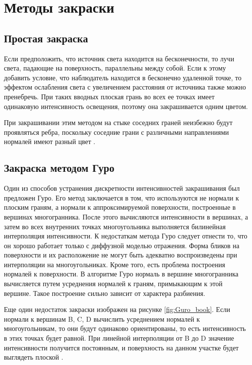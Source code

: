 \section{Методы закраски}
\subsection{Простая закраска}
Если предположить, что источник света находится на бесконечности, то лучи света, падающие на поверхность, параллельны между собой. Если к этому добавить условие, что наблюдатель находится в бесконечно удаленной точке, то эффектом ослабления света с увеличением расстояния от источника также можно пренебречь. При таких вводных плоская грань во всех ее точках имеет одинаковую интенсивность освещения, поэтому она закрашивается одним цветом.

При закрашивании этим методом на стыке соседних граней неизбежно будут проявляться ребра, поскольку соседние грани с различными направлениями нормалей имеют разный цвет \cite{lit5}.

\subsection{Закраска методом Гуро}
Один из способов устранения дискретности интенсивностей закрашивания был предложен Гуро. Его метод заключается в том, что используются не нормали к плоским граням, а нормали к аппроксимируемой поверхности, построенные в вершинах многогранника. После этого вычисляются интенсивности в вершинах, а затем во всех внутренних точках многоугольника выполняется билинейная интерполяция интенсивности.
К недостаткам метода Гуро следует отнести то, что он хорошо работает только с диффузной моделью отражения. Форма бликов на поверхности и их расположение не могут быть адекватно воспроизведены при интерполяции на многоугольниках. Кроме того, есть проблема построения нормалей к поверхности. В алгоритме Гуро нормаль в вершине многогранника вычисляется путем усреднения нормалей к граням, примыкающим к этой вершине. Такое построение сильно зависит от характера разбиения. 

Еще один недостаток закраски изображен на рисунке \ref{fig:Guro_book}. Если нормали к вершинам B, C, D вычислить усреднением нормалей к многоугольникам, то они будут одинаково ориентированы, то есть интенсивность в этих точках будет равной. При линейной интерполяции от B до D значение интенсивности получится постоянным, и поверхность на данном участке будет выглядеть плоской \cite{lit5}.

